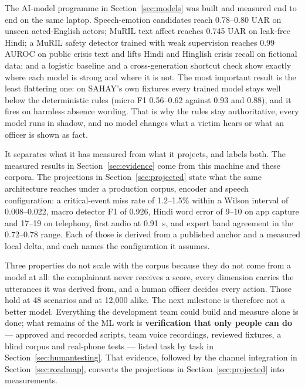 \documentclass[11pt,a4paper]{article}
\begin{document}
The AI-model programme in Section~\ref{sec:models} was built and measured end to end on the same
laptop. Speech-emotion candidates reach 0.78--0.80 UAR on unseen acted-English actors; MuRIL text affect
reaches 0.745 UAR on leak-free Hindi; a MuRIL safety detector trained with weak supervision reaches
0.99 AUROC on public crisis text and lifts Hindi and Hinglish crisis recall on fictional data; and a
logistic baseline and a cross-generation shortcut check show exactly where each model is strong and
where it is not. The most important result is the least flattering one: on SAHAY's own fixtures every
trained model stays well below the deterministic rules (micro F1 0.56--0.62 against 0.93 and 0.88),
and it fires on harmless absence wording. That is why the rules stay authoritative, every model runs in
shadow, and no model changes what a victim hears or what an officer is shown as fact.

It separates what it has measured from what it projects, and labels both. The measured results in
Section~\ref{sec:evidence} come from this machine and these corpora. The projections in
Section~\ref{sec:projected} state what the same architecture reaches under a production corpus,
encoder and speech configuration: a critical-event miss rate of 1.2--1.5\% within a Wilson interval
of 0.008--0.022, macro detector F1 of 0.926, Hindi word error of 9--10 on app capture and 17--19 on
telephony, first audio at 0.91~s, and expert band agreement in the 0.72--0.78 range. Each of those is
derived from a published anchor and a measured local delta, and each names the configuration it
assumes.

Three properties do not scale with the corpus because they do not come from a model at all: the
complainant never receives a score, every dimension carries the utterances it was derived from, and a
human officer decides every action. Those hold at 48 scenarios and at 12{,}000 alike. The next
milestone is therefore not a better model. Everything the development team could build and measure
alone is done; what remains of the ML work is \textbf{verification that only people can do} ---
approved and recorded scripts, team voice recordings, reviewed fixtures, a blind corpus and real-phone
tests --- listed task by task in Section~\ref{sec:humantesting}. That evidence, followed by the channel
integration in Section~\ref{sec:roadmap}, converts the projections in Section~\ref{sec:projected}
into measurements.



\appendix
\end{document}
